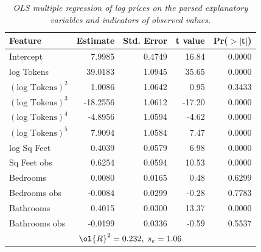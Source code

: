 \documentclass[12pt]{article}
\begin{document}
 
 \begin{table}[ht]
\caption{ \label{tab:parsed} {\sl OLS multiple regression of log prices on the
 parsed explanatory variables and  indicators of observed values.}}
\centering
\begin{tabular}{lrrrr}
  \hline
    Feature       & Estimate & Std. Error & t value & Pr($>$$|$t$|$) \\ 
  \hline
  Intercept       & 7.9985 & 0.4749 & 16.84 & 0.0000 \\ 
  log Tokens      & 39.0183 & 1.0945 & 35.65 & 0.0000 \\ 
  $(\mbox{log Tokens})^2$   & 1.0086 & 1.0642 & 0.95 & 0.3433 \\ 
  $(\mbox{log Tokens})^3$ & -18.2556 & 1.0612 & -17.20 & 0.0000 \\ 
  $(\mbox{log Tokens})^4$ & -4.8956 & 1.0594 & -4.62 & 0.0000 \\ 
  $(\mbox{log Tokens})^5$ & 7.9094 & 1.0584 & 7.47 & 0.0000 \\ 
  log Sq Feet     & 0.4039 & 0.0579 & 6.98 & 0.0000 \\ 
  Sq Feet obs     & 0.6254 & 0.0594 & 10.53 & 0.0000 \\ 
  Bedrooms        & 0.0080 & 0.0165 & 0.48 & 0.6299 \\ 
  Bedrooms obs    & -0.0084 & 0.0299 & -0.28 & 0.7783 \\ 
  Bathrooms       & 0.4015 & 0.0300 & 13.37 & 0.0000 \\ 
  Bathrooms obs   & -0.0199 & 0.0336 & -0.59 & 0.5537 \\ 
   \hline
   \multicolumn{5}{c}{$\ol{R}^2 = 0.232, \; s_e = 1.06$}\\
   \hline
\end{tabular}
\end{table}

 
 
\end{document}
